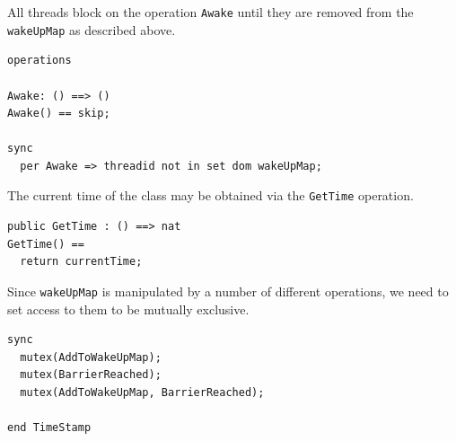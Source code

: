 \documentclass{overturerepchap}
\begin{document}
All threads block on the operation \texttt{Awake} until they are removed from
the \texttt{wakeUpMap} as described above.

\begin{lstlisting}
operations

Awake: () ==> ()
Awake() == skip;

sync
  per Awake => threadid not in set dom wakeUpMap;
\end{lstlisting}

%

%

%
%
%

The current time of the class may be obtained via the \texttt{GetTime}
operation.

\begin{lstlisting}
public GetTime : () ==> nat
GetTime() ==
  return currentTime;
\end{lstlisting}

Since \texttt{wakeUpMap} is manipulated by a number of different
operations, we need to set access to them to be mutually exclusive.

\begin{lstlisting}
sync
  mutex(AddToWakeUpMap);
  mutex(BarrierReached);
  mutex(AddToWakeUpMap, BarrierReached);

end TimeStamp
\end{lstlisting}
 
\end{document}
